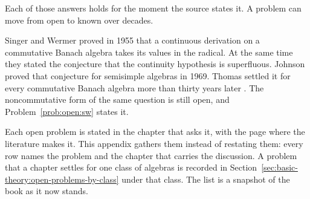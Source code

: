 Each of those answers holds for the moment the source states it. %
A problem can move from open to known over decades. %

\begin{example}\label{ex:appendix:three-answers}
Singer and Wermer proved in 1955 that a continuous derivation on a commutative %
Banach algebra takes its values in the radical. %
At the same time they stated the conjecture that the continuity hypothesis is %
superfluous. %
Johnson proved that conjecture for semisimple algebras in 1969. %
Thomas settled it for every commutative Banach algebra more than thirty years %
later \cite[p.~710]{BresarVillena2002}. %
The noncommutative form of the same question is still open, and %
Problem~\ref{prob:open:sw} states it. %
\end{example}

Each open problem is stated in the chapter that asks it, with the page where %
the literature makes it. %
This appendix gathers them instead of restating them: every row names the %
problem and the chapter that carries the discussion. %
A problem that a chapter settles for one class of algebras is recorded in %
Section~\ref{sec:basic-theory:open-problems-by-class} under that class. %
The list is a snapshot of the book as it now stands. %

